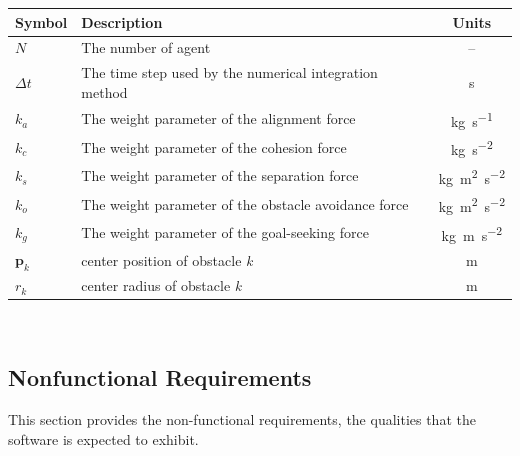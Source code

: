 \documentclass[12pt]{article}
\begin{document}
\noindent
\begin{table}[!h]
\caption{Specification Parameter Values} \label{TabReqInputs}
\renewcommand{\arraystretch}{1.2}
\noindent \begin{longtable*}{l l c} 
  \toprule
  \textbf{Symbol} & \textbf{Description} & \textbf{Units} \\
  \midrule 
  $N$ & The number of agent & --\\
  $\Delta t$ & The time step used by the numerical integration method & \si{\second}\\
  $k_a$ & The weight parameter of the alignment force & \si{\kilogram\per\second}\\
  $k_c$ & The weight parameter of the cohesion force & \si{\kilogram\per\second^2}\\
  $k_s$ & The weight parameter of the separation force & \si{\kilogram\meter^2\per\second^2}\\
  $k_o$ & The weight parameter of the obstacle avoidance force & \si{\kilogram\meter^2\per\second^2}\\
  $k_g$ & The weight parameter of the goal-seeking force & \si{\kilogram\meter\per\second^2}\\
  $\mathbf{p}_k$ & center position of obstacle \textit{k} & \si{\meter} \\
  $r_k$ & center radius of obstacle \textit{k} & \si{\meter} \\
  \bottomrule
\end{longtable*}
\end{table}

~\newpage

\subsection{Nonfunctional Requirements}

This section provides the non-functional requirements, the qualities that the 
software is expected to exhibit.
\end{document}
